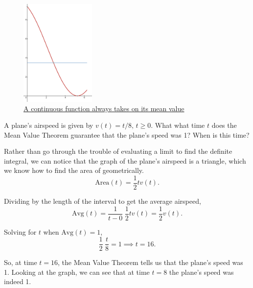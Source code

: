 \begin{figure}[H]
	\label{mvt}
	\centering
	\includegraphics[width = 0.33\textwidth]{./integrals/mvt.png}
	\caption{\hyperref{}{}{}{A continuous function always takes on its mean value}}
\end{figure}

\begin{example}
	A plane's airspeed is given by $v(t) = t/8\text{, }t\geq 0$.
	What what time $t$ does the Mean Value Theorem guarantee that the plane's speed was 1?
	When is this time?
\end{example}
\begin{answer}
	Rather than go through the trouble of evaluating a limit to find the definite integral, we can notice that the graph of the plane's airspeed is a triangle, which we know how to find the area of geometrically.
	\begin{equation*}
		\text{Area}(t) = \frac{1}{2}tv(t).
	\end{equation*}
	
	Dividing by the length of the interval to get the average airspeed,
	\begin{equation*}
		\text{Avg}(t) = \frac{1}{t-0}\hspace{3pt}\frac{1}{2}tv(t) = \frac{1}{2}v(t).
	\end{equation*}
	
	Solving for $t$ when $\text{Avg}(t)=1$,
	\begin{equation*}
		\frac{1}{2}\hspace{3pt}\frac{t}{8} = 1 \implies t = 16.
	\end{equation*}
	
	So, at time $t=16$, the Mean Value Theorem tells us that the plane's speed was 1.
	Looking at the graph, we can see that at time $t=8$ the plane's speed was indeed 1.
\end{answer}

